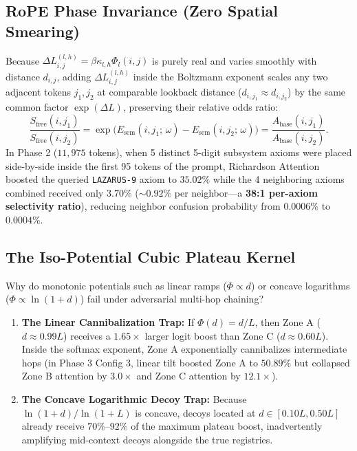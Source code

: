 \documentclass[11pt,letterpaper]{article}
\theoremstyle{definition}
\begin{document}
\subsection{RoPE Phase Invariance (Zero Spatial Smearing)}
Because $\Delta L^{(l,h)}_{i,j} = \beta \kappa_{l,h} \Phi_l(i,j)$ is purely real and varies smoothly with distance $d_{i,j}$, adding $\Delta L^{(l,h)}_{i,j}$ inside the Boltzmann exponent scales any two adjacent tokens $j_1, j_2$ at comparable lookback distance ($d_{i,j_1} \approx d_{i,j_2}$) by the same common factor $\exp(\Delta L)$, preserving their relative odds ratio:
\begin{equation}
    \frac{S_{\text{free}}(i, j_1)}{S_{\text{free}}(i, j_2)} = \exp\!\Big(E_{\text{sem}}(i, j_1;\, \omega) - E_{\text{sem}}(i, j_2;\, \omega)\Big) = \frac{A_{\text{base}}(i, j_1)}{A_{\text{base}}(i, j_2)}.
\end{equation}
In Phase 2 ($11,975$ tokens), when 5 distinct 5-digit subsystem axioms were placed side-by-side inside the first 95 tokens of the prompt, Richardson Attention boosted the queried \texttt{LAZARUS-9} axiom to $35.02\%$ while the 4 neighboring axioms combined received only $3.70\%$ ($\sim 0.92\%$ per neighbor---a \textbf{38:1 per-axiom selectivity ratio}), reducing neighbor confusion probability from $0.0006\%$ to $0.0004\%$.

\subsection{The Iso-Potential Cubic Plateau Kernel}
Why do monotonic potentials such as linear ramps ($\Phi \propto d$) or concave logarithms ($\Phi \propto \ln(1+d)$) fail under adversarial multi-hop chaining?
\begin{enumerate}
    \item \textbf{The Linear Cannibalization Trap:} If $\Phi(d) = d / L$, then Zone A ($d \approx 0.99 L$) receives a $1.65\times$ larger logit boost than Zone C ($d \approx 0.60 L$). Inside the softmax exponent, Zone A exponentially cannibalizes intermediate hops (in Phase 3 Config 3, linear tilt boosted Zone A to $50.89\%$ but collapsed Zone B attention by $3.0\times$ and Zone C attention by $12.1\times$).
    \item \textbf{The Concave Logarithmic Decoy Trap:} Because $\ln(1+d)/\ln(1+L)$ is concave, decoys located at $d \in [0.10 L, 0.50 L]$ already receive $70\%\text{--}92\%$ of the maximum plateau boost, inadvertently amplifying mid-context decoys alongside the true registries.
\end{enumerate}
\end{document}
